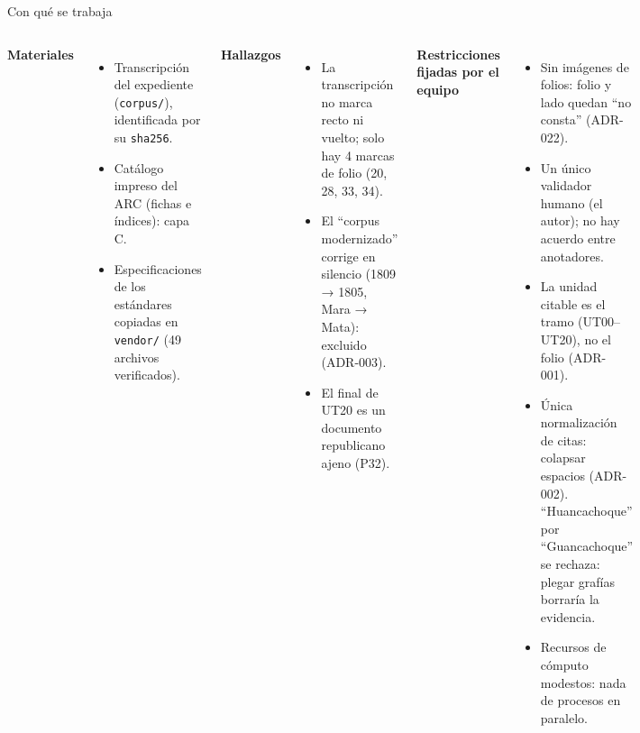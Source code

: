 \documentclass[aspectratio=169,10pt]{beamer}
\newcommand{\ttt}[1]{\texttt{\small #1}}
\begin{document}
\begin{frame}[shrink=10]{Con qué se trabaja}
\begin{columns}[T]
\textbf{Materiales}
\begin{itemize}\small
\item Transcripción del expediente (\ttt{corpus/}), identificada por su \ttt{sha256}.
\item Catálogo impreso del ARC (fichas e índices): capa C.
\item Especificaciones de los estándares copiadas en \ttt{vendor/} (49 archivos verificados).
\end{itemize}
\textbf{Hallazgos}
\begin{itemize}\small
\item La transcripción no marca recto ni vuelto; solo hay 4 marcas de folio (20, 28, 33, 34).
\item El \enquote{corpus modernizado} corrige en silencio (1809 → 1805, Mara → Mata): \alert{excluido} (ADR-003).
\item El final de UT20 es un documento republicano ajeno (P32).
\end{itemize}
\textbf{Restricciones fijadas por el equipo}
\begin{itemize}\small
\item Sin imágenes de folios: folio y lado quedan \enquote{no consta} (ADR-022).
\item Un único validador humano (el autor); no hay acuerdo entre anotadores.
\item La unidad citable es el \alert{tramo} (UT00–UT20), no el folio (ADR-001).
\item Única normalización de citas: colapsar espacios (ADR-002). \enquote{Huancachoque} por
      \enquote{Guancachoque} se rechaza: plegar grafías borraría la evidencia.
\item Recursos de cómputo modestos: nada de procesos en paralelo.
\end{itemize}
\end{columns}
\end{frame}
\end{document}
